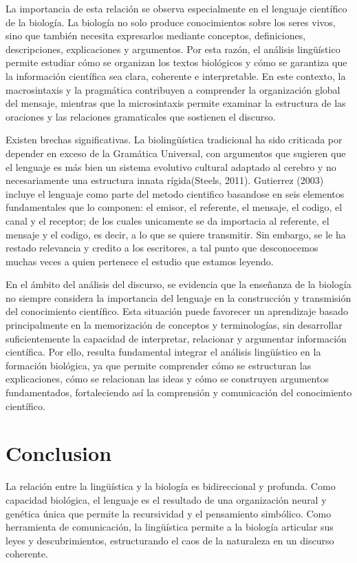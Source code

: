 \documentclass[12pt]{article}
\begin{document}
La importancia de esta relación se observa especialmente en el lenguaje científico de la biología. La biología no solo produce conocimientos sobre los seres vivos, sino que también necesita expresarlos mediante conceptos, definiciones, descripciones, explicaciones y argumentos. Por esta razón, el análisis lingüístico permite estudiar cómo se organizan los textos biológicos y cómo se garantiza que la información científica sea clara, coherente e interpretable. En este contexto, la macrosintaxis y la pragmática contribuyen a comprender la organización global del mensaje, mientras que la microsintaxis permite examinar la estructura de las oraciones y las relaciones gramaticales que sostienen el discurso.

Existen brechas significativas. La biolingüística tradicional ha sido criticada por depender en exceso de la Gramática Universal, con argumentos que sugieren que el lenguaje es más bien un sistema evolutivo cultural adaptado al cerebro y no necesariamente una estructura innata rígida(Steels, 2011). Gutierrez (2003) incluye el lenguaje como parte del metodo cientifico basandose en seis elementos fundamentales que lo componen: el emisor, el referente, el mensaje, el codigo, el canal y el receptor; de los cuales unicamente se da importacia al referente, el mensaje y el codigo, es decir, a lo que se quiere transmitir. Sin embargo, se le ha restado relevancia y credito a los escritores, a tal punto que desconocemos muchas veces a quien pertenece el estudio que estamos leyendo.

En el ámbito del análisis del discurso, se evidencia que la enseñanza de la biología no siempre considera la importancia del lenguaje en la construcción y transmisión del conocimiento científico. Esta situación puede favorecer un aprendizaje basado principalmente en la memorización de conceptos y terminologías, sin desarrollar suficientemente la capacidad de interpretar, relacionar y argumentar información científica. Por ello, resulta fundamental integrar el análisis lingüístico en la formación biológica, ya que permite comprender cómo se estructuran las explicaciones, cómo se relacionan las ideas y cómo se construyen argumentos fundamentados, fortaleciendo así la comprensión y comunicación del conocimiento científico.

\section{Conclusion}
La relación entre la lingüística y la biología es bidireccional y profunda. Como capacidad biológica, el lenguaje es el resultado de una organización neural y genética única que permite la recursividad y el pensamiento simbólico. Como herramienta de comunicación, la lingüística permite a la biología articular sus leyes y descubrimientos, estructurando el caos de la naturaleza en un discurso coherente.
\end{document}
